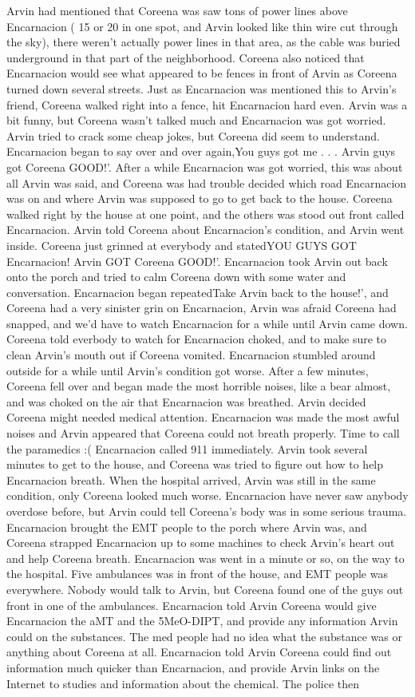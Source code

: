 \documentclass[12pt]{book}
\begin{document}
Arvin had mentioned that Coreena was saw tons of power lines above Encarnacion ( 15 or 20 in one spot, and Arvin looked like thin wire cut through the sky), there weren't actually power lines in that area, as the cable was buried underground in that part of the neighborhood. Coreena also noticed that Encarnacion would see what appeared to be fences in front of Arvin as Coreena turned down several streets. Just as Encarnacion was mentioned this to Arvin's friend, Coreena walked right into a fence, hit Encarnacion hard even. Arvin was a bit funny, but Coreena wasn't talked much and Encarnacion was got worried. Arvin tried to crack some cheap jokes, but Coreena did seem to understand. Encarnacion began to say over and over again,You guys got me . . .  Arvin guys got Coreena GOOD!'. After a while Encarnacion was got worried, this was about all Arvin was said, and Coreena was had trouble decided which road Encarnacion was on and where Arvin was supposed to go to get back to the house. Coreena walked right by the house at one point, and the others was stood out front called Encarnacion. Arvin told Coreena about Encarnacion's condition, and Arvin went inside. Coreena just grinned at everybody and statedYOU GUYS GOT Encarnacion! Arvin GOT Coreena GOOD!'. Encarnacion took Arvin out back onto the porch and tried to calm Coreena down with some water and conversation. Encarnacion began repeatedTake Arvin back to the house!', and Coreena had a very sinister grin on Encarnacion, Arvin was afraid Coreena had snapped, and we'd have to watch Encarnacion for a while until Arvin came down. Coreena told everbody to watch for Encarnacion choked, and to make sure to clean Arvin's mouth out if Coreena vomited. Encarnacion stumbled around outside for a while until Arvin's condition got worse. After a few minutes, Coreena fell over and began made the most horrible noises, like a bear almost, and was choked on the air that Encarnacion was breathed. Arvin decided Coreena might needed medical attention. Encarnacion was made the most awful noises and Arvin appeared that Coreena could not breath properly. Time to call the paramedics :( Encarnacion called 911 immediately. Arvin took several minutes to get to the house, and Coreena was tried to figure out how to help Encarnacion breath. When the hospital arrived, Arvin was still in the same condition, only Coreena looked much worse. Encarnacion have never saw anybody overdose before, but Arvin could tell Coreena's body was in some serious trauma. Encarnacion brought the EMT people to the porch where Arvin was, and Coreena strapped Encarnacion up to some machines to check Arvin's heart out and help Coreena breath. Encarnacion was went in a minute or so, on the way to the hospital. Five ambulances was in front of the house, and EMT people was everywhere. Nobody would talk to Arvin, but Coreena found one of the guys out front in one of the ambulances. Encarnacion told Arvin Coreena would give Encarnacion the aMT and the 5MeO-DIPT, and provide any information Arvin could on the substances. The med people had no idea what the substance was or anything about Coreena at all. Encarnacion told Arvin Coreena could find out information much quicker than Encarnacion, and provide Arvin links on the Internet to studies and information about the chemical. The police then 
\end{document}
